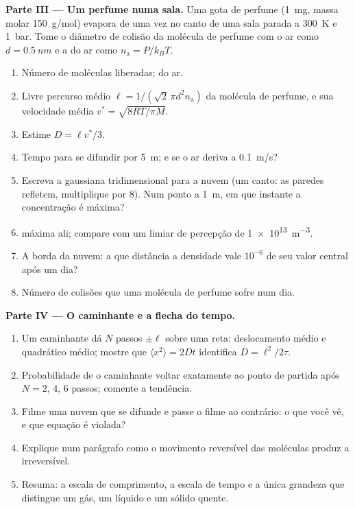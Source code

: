\begin{problem}
\textbf{Parte III --- Um perfume numa sala.}
Uma gota de perfume (\qty{1}{mg}, massa molar \qty{150}{g/mol}) evapora
de uma vez no canto de uma sala parada a \qty{300}{K} e \qty{1}{bar}.
Tome o diâmetro de colisão da molécula de perfume com o ar como $d =
\qty{0.5}{nm}$ e a  do ar como $n_{\text{a}} = P/k_BT$.
\begin{enumerate}[resume]
  \item Número de moléculas liberadas;  do ar.
  \item Livre percurso médio $\ell = 1/(\sqrt2\,\pi d^2 n_{\text{a}})$ da
        molécula de perfume, e sua velocidade média $v^* = \sqrt{8RT/\pi M}$.
  \item Estime $D = \ell v^*/3$.
  \item Tempo para se difundir por \qty{5}{m}; e se o ar deriva a
        \qty{0.1}{m/s}?
  \item Escreva a gaussiana tridimensional para a nuvem (um canto:
        as paredes refletem, multiplique por $8$). Num ponto a \qty{1}{m},
        em que instante a concentração é máxima?
  \item {} máxima ali; compare com um limiar de
        percepção de \qty{1e13}{m^{-3}}.
  \item A borda da nuvem: a que distância a densidade vale $10^{-6}$ de
        seu valor central após um dia?
  \item Número de colisões que uma molécula de perfume sofre num dia.
\end{enumerate}

\textbf{Parte IV --- O caminhante e a flecha do tempo.}
\begin{enumerate}[resume]
  \item Um caminhante dá $N$ passos $\pm\ell$ sobre uma reta: deslocamento médio e
        quadrático médio; mostre que $\langle x^2\rangle = 2Dt$
        identifica $D = \ell^2/2\tau$.
  \item Probabilidade de o caminhante voltar exatamente ao ponto de partida após
        $N = 2$, $4$, $6$ passos; comente a tendência.
  \item Filme uma nuvem que se difunde e passe o filme ao contrário: o que você
        vê, e que equação é violada?
  \item Explique num parágrafo como o movimento reversível das moléculas
        produz a  irreversível.
  \item Resuma: a escala de comprimento, a escala de tempo e a única
        grandeza que distingue um gás, um líquido e um sólido quente.
\end{enumerate}
\end{problem}
